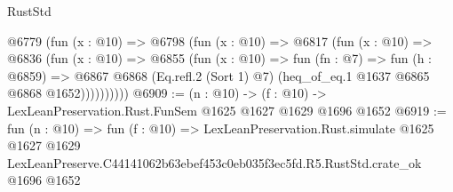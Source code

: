\begin{lexlean}{RustStd}
\begin{coremodule}
          @6779
            (fun (x : @10) =>
            @6798
              (fun (x : @10) =>
              @6817
                (fun (x : @10) =>
                @6836
                  (fun (x : @10) =>
                  @6855
                    (fun (x : @10) =>
                    fun (fn : @7) =>
                    fun (h : @6859) =>
                    @6867
                      @6868
                      (Eq.refl.{2} (Sort 1) @7)
                      (heq_of_eq.{1} @1637 @6865 @6868 @1652))))))))))
@6909 := (n : @10) -> (f : @10) -> LexLeanPreservation.Rust.FunSem @1625 @1627 @1629 @1696 @1652
@6919 := fun (n : @10) =>
  fun (f : @10) =>
  LexLeanPreservation.Rust.simulate
    @1625
    @1627
    @1629
    LexLeanPreserve.C44141062b63ebef453c0eb035f3ec5fd.R5.RustStd.crate_ok
    @1696
    @1652
\end{coremodule}
\end{lexlean}
